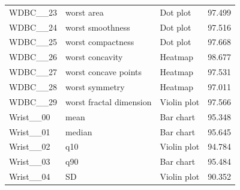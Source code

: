 \begin{longtable}{p{2.7cm}p{5.5cm}p{3.4cm}r}
WDBC\_\_23 & worst area & Dot plot & 97.499\\
WDBC\_\_24 & worst smoothness & Dot plot & 97.516\\
WDBC\_\_25 & worst compactness & Dot plot & 97.668\\
WDBC\_\_26 & worst concavity & Heatmap & 98.677\\
WDBC\_\_27 & worst concave points & Heatmap & 97.531\\
WDBC\_\_28 & worst symmetry & Heatmap & 97.011\\
WDBC\_\_29 & worst fractal dimension & Violin plot & 97.566\\
Wrist\_\_00 & mean & Bar chart & 95.348\\
Wrist\_\_01 & median & Bar chart & 95.645\\
Wrist\_\_02 & q10 & Violin plot & 94.784\\
Wrist\_\_03 & q90 & Bar chart & 95.484\\
Wrist\_\_04 & SD & Violin plot & 90.352\\
\bottomrule\end{longtable}

